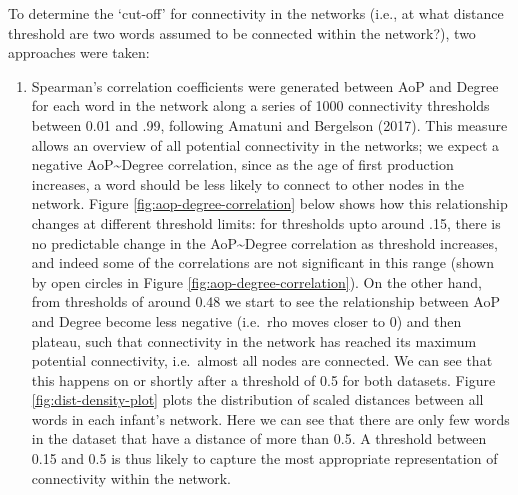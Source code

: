\documentclass[
  man,floatsintext]{apa6}
\providecommand{\tightlist}{%
  \setlength{\itemsep}{0pt}\setlength{\parskip}{0pt}}
\begin{document}
To determine the `cut-off' for connectivity in the networks (i.e., at what distance threshold are two words assumed to be connected within the network?), two approaches were taken:

\begin{enumerate}
\def\labelenumi{\arabic{enumi})}
\tightlist
\item
  Spearman's correlation coefficients were generated between AoP and Degree for each word in the network along a series of 1000 connectivity thresholds between 0.01 and .99, following Amatuni and Bergelson (2017). This measure allows an overview of all potential connectivity in the networks; we expect a negative AoP\textasciitilde Degree correlation, since as the age of first production increases, a word should be less likely to connect to other nodes in the network. Figure \ref{fig:aop-degree-correlation} below shows how this relationship changes at different threshold limits: for thresholds upto around .15, there is no predictable change in the AoP\textasciitilde Degree correlation as threshold increases, and indeed some of the correlations are not significant in this range (shown by open circles in Figure \ref{fig:aop-degree-correlation}). On the other hand, from thresholds of around 0.48 we start to see the relationship between AoP and Degree become less negative (i.e.~rho moves closer to 0) and then plateau, such that connectivity in the network has reached its maximum potential connectivity, i.e.~almost all nodes are connected. We can see that this happens on or shortly after a threshold of 0.5 for both datasets. Figure \ref{fig:dist-density-plot} plots the distribution of scaled distances between all words in each infant's network. Here we can see that there are only few words in the dataset that have a distance of more than 0.5. A threshold between 0.15 and 0.5 is thus likely to capture the most appropriate representation of connectivity within the network.
\end{enumerate}
\end{document}
